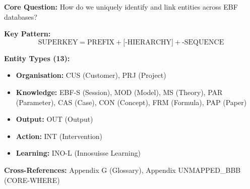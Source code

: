 \begin{tcolorbox}[colback=blue!5!white, colframe=blue!75!black,
    title=Quick Reference: Superkey Specification]

\textbf{Core Question:} How do we uniquely identify and link entities across EBF databases?

\textbf{Key Pattern:}
\begin{equation}
\text{SUPERKEY} = \text{PREFIX} + \text{[-HIERARCHY]} + \text{-SEQUENCE}
\end{equation}

\textbf{Entity Types (13):}
\begin{itemize}[nosep]
\item \textbf{Organisation:} CUS (Customer), PRJ (Project)
\item \textbf{Knowledge:} EBF-S (Session), MOD (Model), MS (Theory), PAR (Parameter), CAS (Case), CON (Concept), FRM (Formula), PAP (Paper)
\item \textbf{Output:} OUT (Output)
\item \textbf{Action:} INT (Intervention)
\item \textbf{Learning:} INO-L (Innosuisse Learning)
\end{itemize}

\textbf{Cross-References:} Appendix G (Glossary), Appendix UNMAPPED_BBB (CORE-WHERE)
\end{tcolorbox}



